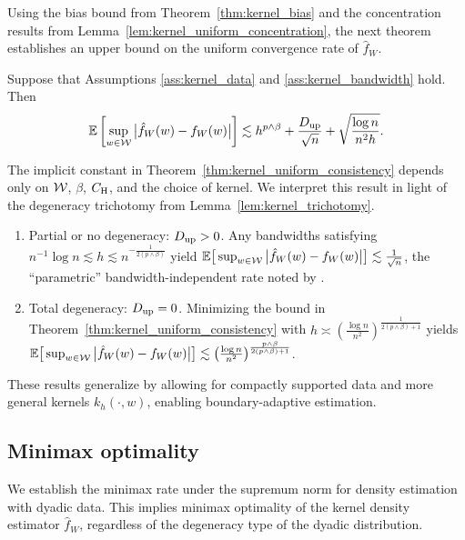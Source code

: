Using the bias bound from Theorem~\ref{thm:kernel_bias} and
the concentration results from Lemma~\ref{lem:kernel_uniform_concentration},
the next theorem establishes an upper bound on the uniform convergence rate of
$\hat f_W$.
%
\begin{theorem}%
  \label{thm:kernel_uniform_consistency}%
  Suppose that Assumptions \ref{ass:kernel_data} and
  \ref{ass:kernel_bandwidth} hold. Then
  \begin{align*}
    \mathbb{E}\left[
      \sup_{w \in \mathcal{W}}
      \big|\hat{f}_W(w) - f_W(w)\big|
    \right]
    \lesssim
    h^{p\wedge\beta} + \frac{D_{\textup{up}}}{\sqrt n} + \sqrt{\frac{\log n}{n^2h}}.
  \end{align*}
\end{theorem}
%
The implicit constant in Theorem~\ref{thm:kernel_uniform_consistency} depends
only on
$\mathcal{W}$, $\beta$, $C_{\mathrm{H}}$, and the choice of kernel. We interpret this result in
light of the degeneracy trichotomy from Lemma~\ref{lem:kernel_trichotomy}.
%
\begin{enumerate}[label=(\roman*)]
  \item Partial or no degeneracy: $D_{\textup{up}} > 0$.
    Any bandwidths satisfying
    $n^{-1} \log n \lesssim h \lesssim n^{-\frac{1}{2(p\wedge\beta)}}$ yield
    $\mathbb{E}\big[\sup_{w \in \mathcal{W}}\big|\hat f_W(w)
    - f_W(w)\big| \big] \lesssim \frac{1}{\sqrt n}$, the ``parametric''
    bandwidth-independent rate noted by \citet{graham2024kernel}.

  \item Total degeneracy: $D_{\textup{up}} = 0$.
    Minimizing the bound in Theorem~\ref{thm:kernel_uniform_consistency} with
    $h \asymp \left( \frac{\log n}{n^2} \right)^{\frac{1}{2(p\wedge\beta)+1}}$
    yields $\mathbb{E}\big[ \sup_{w \in \mathcal{W}} \big|\hat f_W(w) - f_W(w)\big| \big]
    \lesssim
    \big(\frac{\log n}{n^2} \big)^{\frac{p\wedge\beta}{2(p\wedge\beta)+1}}$.
\end{enumerate}

These results generalize \citet*[Theorem~1]{chiang2020empirical}
by allowing for compactly supported data and more general kernels
$k_h(\cdot,w)$, enabling boundary-adaptive estimation.

\subsection{Minimax optimality}

We establish the minimax rate under the supremum norm for density estimation
with dyadic data. This implies minimax optimality of the kernel density
estimator $\hat f_W$, regardless of the degeneracy type of the dyadic
distribution.

